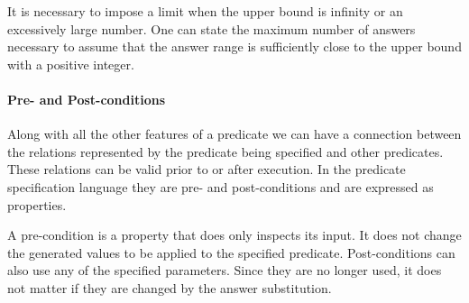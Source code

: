 It is necessary to impose a limit when the upper bound is infinity or an
excessively large number.
%
One can state the maximum number of answers necessary to assume that the
answer range is sufficiently close to the upper bound with a positive
integer.

\paragraph{\bf Pre- and Post-conditions}

Along with all the other features of a predicate we can have a
connection between the relations represented by the predicate being
specified and other predicates.
%
These relations can be valid prior to or after execution.
%
In the predicate specification language they are pre- and
post-conditions and are expressed as \plqc{} properties.


A pre-condition is a property that does only inspects its input.
%
It does not change the generated values to be applied to the specified
predicate.
%
Post-conditions can also use any of the specified parameters.
%
Since they are no longer used, it does not matter if they are changed by
the answer substitution.

